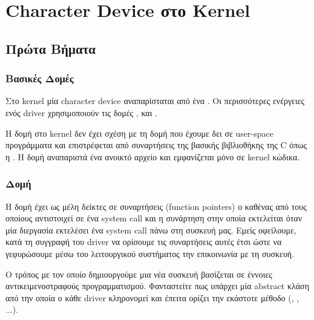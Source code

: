 \documentclass[18pt]{extarticle}
\begin{document}




\section{Character Device στο Kernel}

\subsection{Πρώτα Βήματα}

\subsubsection{Βασικές Δομές}

Στο kernel μία character device αναπαρίσταται από ένα .
Οι περισσότερες ενέργειες ενός driver χρησιμοποιούν τις δομές ,  και .

\begin{warn}[Προσοχή]
    Η δομή  στο kernel δεν έχει σχέση με τη δομή  που έχουμε δει σε user-space προγράμματα 
    και επιστρέφεται από συναρτήσεις της βασικής βιβλιοθήκης της C όπως η .
    Η δομή  αναπαριστά ένα ανοικτό αρχείο και εμφανίζεται μόνο σε kernel κώδικα.
\end{warn}


\subsubsection{Δομή }

Η δομή  έχει ως μέλη δείκτες σε συναρτήσεις (function pointers) ο καθένας από τους οποίους αντιστοιχεί σε ένα system call
και η συνάρτηση στην οποία  εκτελείται όταν μία διεργασία εκτελέσει ένα system call πάνω στη συσκευή μας.
Εμείς οφείλουμε, κατά τη συγγραφή του driver να ορίσουμε τις συναρτήσεις αυτές έτσι ώστε να γεφυρώσουμε μέσω του λειτουργικού συστήματος την επικοινωνία με τη συσκευή.

\begin{file}
        
\end{file}

O τρόπος με τον οποίο δημιουργούμε μια νέα συσκευή βασίζεται σε έννοιες αντικειμενοστραφούς προγραμματισμού.
Φανταστείτε πως υπάρχει μία abstract κλάση  από την οποία ο κάθε driver κληρονομεί και έπειτα ορίζει την εκάστοτε μέθοδο (, , ...).
\end{document}
